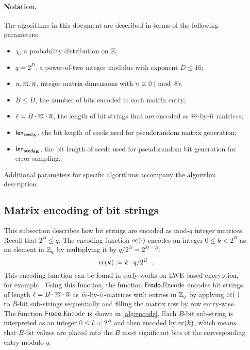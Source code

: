 \documentclass{iacrcc}
\begin{document}
\paragraph{Notation.}
The algorithms in this document are described in terms of the following parameters:
\begin{itemize}
\item $\chi$, a probability distribution on $\mathbb{Z}$;
\item $q=2^D$, a power-of-two integer modulus with exponent $D\leq 16$;
\item $n,\overline{m},\overline{n}$, integer matrix dimensions with $n \equiv 0
  \pmod 8$;
\item $B\leq D$, the number of bits encoded in each matrix entry;
\item $\ell=B\cdot \overline{m}\cdot\overline{n}$, the length of bit strings that are encoded as $\overline{m}$-by-$\overline{n}$ matrices;
\item ${\mathsf{len}_{{\mathsf{seed}_{\mathbf{A}}}}}$, the bit length of seeds used for pseudorandom matrix generation;
\item ${\mathsf{len}_{{\mathsf{seed}_{\mathbf{S}\mathbf{E}}}}}$, the bit length of seeds used for pseudorandom bit generation for error sampling.
\end{itemize}

Additional parameters for specific algorithms accompany the algorithm description.

\subsection{Matrix encoding of bit strings}
\label{sec:matrix-encoding}

This subsection describes how bit strings are encoded as mod-$q$ integer matrices.
Recall that $2^B \leq q$. The encoding function $\textrm{\upshape\mdseries ec}(\cdot)$ encodes an integer $0 \leq k < 2^B$ as an element in $\mathbb{Z}_q$ by multiplying it by $q/2^B=2^{D-B}$:
\[ \textrm{\upshape\mdseries ec}(k) := k\cdot  q/2^B \enspace . \]
This encoding function can be found in early works on LWE-based encryption, for example \cite{PKC:KawTanXag07,STOC:PeiWat08,C:PeiVaiWat08}.
Using this function, the function $\textsf{\upshape\mdseries Frodo}.\textrm{\upshape\mdseries Encode}$ encodes bit strings of
length $\ell=B\cdot \overline{m}\cdot\overline{n}$ as  $\overline{m}$-by-$\overline{n}$-matrices with
entries in $\mathbb{Z}_q$ by applying $\textrm{\upshape\mdseries ec}(\cdot)$ to $B$-bit sub-strings sequentially and filling the matrix row by row entry-wise. The function $\textsf{\upshape\mdseries Frodo}.\textrm{\upshape\mdseries Encode}$ is shown in \autoref{alg:encode}.
Each $B$-bit sub-string is interpreted as an integer $0 \leq k < 2^B$ and then encoded by $\textrm{\upshape\mdseries ec}(k)$, which means that $B$-bit values are placed into the $B$ most significant bits of the corresponding entry modulo $q$.  
\end{document}
